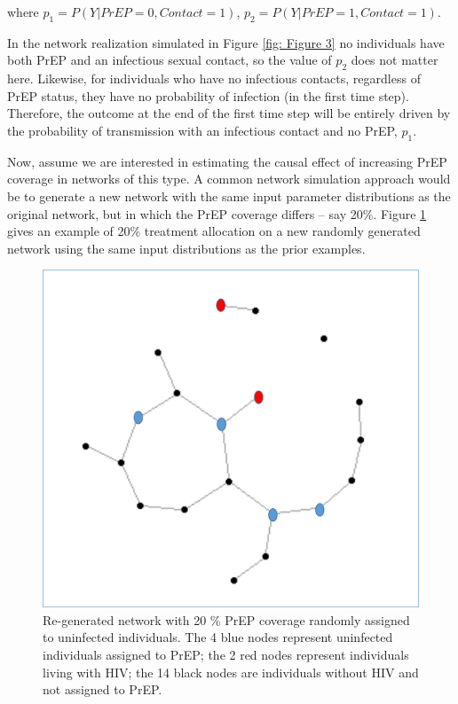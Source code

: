\documentclass{article}
\theoremstyle{definition}
\begin{document}
where $p_1 = P(Y|PrEP=0,Contact=1)$, $p_2 = P(Y|PrEP=1,Contact=1)$.

In the network realization simulated in Figure \ref{fig: Figure 3} no individuals have both PrEP and an infectious sexual contact, so the value of $p_2$ does not matter here. Likewise, for individuals who have no infectious contacts, regardless of PrEP status, they have no probability of infection (in the first time step). Therefore, the outcome at the end of the first time step will be entirely driven by the probability of transmission with an infectious contact and no PrEP, $p_1$.

Now, assume we are interested in estimating the causal effect of increasing PrEP coverage in networks of this type. A common network simulation approach would be to generate a new network with the same input parameter distributions as the original network, but in which the PrEP coverage differs -- say 20\%. Figure \ref{fig: Figure 4} gives an example of 20\% treatment allocation on a new randomly generated network using the same input distributions as the prior examples.

\begin{figure}[H]
    \centering
    \includegraphics[scale=0.5]{Original Figures/Network Example 5.png}
    \caption{Re-generated network with 20 \% PrEP coverage randomly assigned to uninfected individuals. The 4 blue nodes represent uninfected individuals assigned to PrEP; the 2 red nodes represent individuals living with HIV; the 14 black nodes are individuals without HIV and not assigned to PrEP. }
    \label{fig: Figure 4}
\end{figure}
\end{document}
